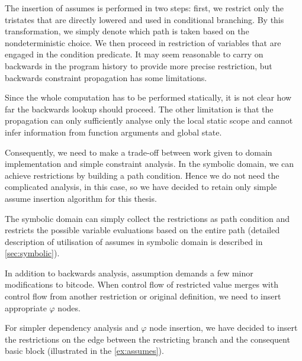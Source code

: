 The insertion of assumes is performed in two steps: first, we restrict only the
tristates that are directly lowered and used in conditional branching. By this
transformation, we simply denote which path is taken based on the nondeterministic
choice. We then proceed in restriction of variables that are engaged in the condition
predicate. It may seem reasonable to carry on backwards in the program history to
provide more precise restriction, but backwards constraint propagation has some
limitations.

Since the whole computation has to be performed statically, it is not clear how far the
backwards lookup should proceed. The other limitation is that the propagation
can only sufficiently analyse only the local static scope and cannot infer
information from function arguments and global state.

Consequently, we need to make a trade-off between work given to domain
implementation and simple constraint analysis. In the symbolic domain, we can achieve restrictions by building a path condition. Hence we do not need the
complicated analysis, in this case, so we have decided to retain only simple
assume insertion algorithm for this thesis.

The symbolic domain can simply collect the restrictions as path condition and
restricts the possible variable evaluations based on the entire path
(detailed description of utilisation of assumes in symbolic domain is
described in \autoref{sec:symbolic}).

In addition to backwards analysis, assumption demands a few minor
modifications to bitcode. When control flow of restricted value merges with
control flow from another restriction or original definition, we need to insert
appropriate $\varphi$ nodes.

For simpler dependency analysis and $\varphi$ node insertion, we have decided
to insert the restrictions on the edge between the restricting branch and the consequent
basic block (illustrated in the \autoref{ex:assumes}).

